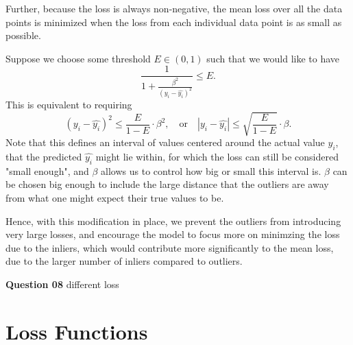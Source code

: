 \documentclass{article}[a4paper]
\begin{document}
	Further, because the loss is always non-negative, the mean loss over all the data points is minimized when
	the loss from each individual data point is as small as possible.
	\newline
	
	Suppose we choose some threshold $E \in (0, 1)$ such that we would like to have \[
		\dfrac{1}{1 + \frac{\beta^2}{\left(y_i - \hat{y_i}\right)^2}} \leq E.
	\] This is equivalent to requiring \[
		\left(y_i - \hat{y_i}\right)^2 \leq \dfrac{E}{1 - E} \cdot \beta^2,
		\quad \text{or} \quad
		\left|y_i - \hat{y_i}\right| \leq \sqrt{\dfrac{E}{1 - E}} \cdot \beta.
	\] Note that this defines an interval of values centered around the actual value $y_i$, that the
	predicted $\hat{y_i}$ might lie within, for which the loss can still be considered "small enough",
	and $\beta$ allows us to control how big or small this interval is. $\beta$ can be chosen
	big enough to include the large distance that the outliers are away from what one might expect their
	true values to be.
	\newline

	Hence, with this modification in place, we prevent the outliers from introducing very large losses, and encourage
	the model to focus more on minimzing the loss due to the inliers, which would contribute more significantly
	to the mean loss, due to the larger number of inliers compared to outliers.
	\newline

	\textbf{Question 08} different loss

	\section{Loss Functions}
\end{document}
